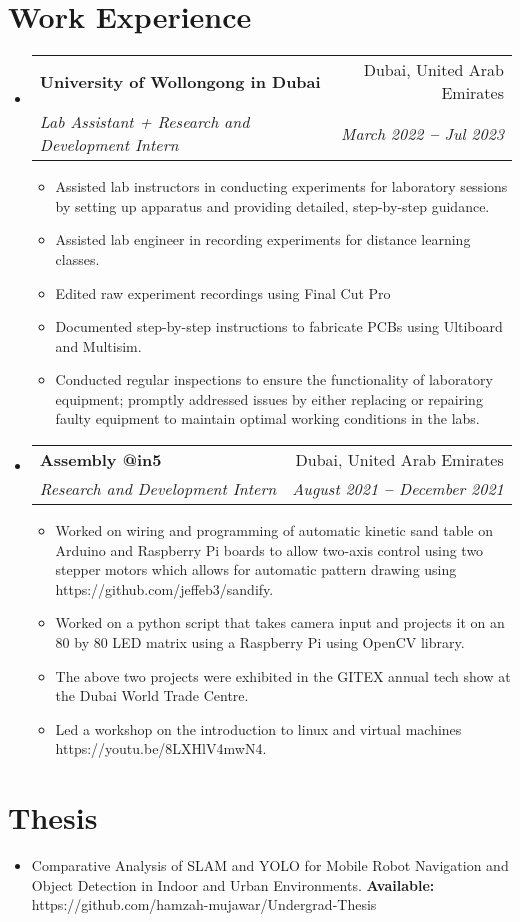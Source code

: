 \documentclass[letterpaper, 11pt]{article}
\makeatletter
\newcommand{\resumeItem}[1]{
  \item\small{
    {#1 \vspace{-2pt}}
  }
}
\newcommand{\resumeSubheading}[4]{
  \vspace{-2pt}\item
    \begin{tabular*}{0.97\textwidth}[t]{l@{\extracolsep{\fill}}r}
      \textbf{#1} & #2 \\
      \textit{\small#3} & \textit{\small #4} \\
    \end{tabular*}\vspace{-7pt}
}
\newcommand{\resumeSubHeadingListStart}{\begin{itemize}[leftmargin=0.15in, label={}]}
\newcommand{\resumeSubHeadingListEnd}{\end{itemize}}
\newcommand{\resumeItemListStart}{\begin{itemize}}
\newcommand{\resumeItemListEnd}{\end{itemize}\vspace{-5pt}}
\makeatother
\begin{document}
\section{Work Experience}
\vspace{3pt}
  \resumeSubHeadingListStart
    \resumeSubheading
      {University of Wollongong in Dubai}{Dubai, United Arab Emirates}
      {Lab Assistant + Research and Development Intern}{March 2022 \textbf{--} Jul 2023}
      \resumeItemListStart
        \resumeItem{Assisted lab instructors in conducting experiments for laboratory sessions by setting up apparatus and providing detailed, step-by-step guidance.}
        \resumeItem{Assisted lab engineer in recording experiments for distance learning classes.}
        \resumeItem{Edited raw experiment recordings using Final Cut Pro}
        \resumeItem{Documented step-by-step instructions to fabricate PCBs using Ultiboard and Multisim.}
        \resumeItem{Conducted regular inspections to ensure the functionality of laboratory equipment; promptly addressed issues by either replacing or repairing faulty equipment to maintain optimal working conditions in the labs.}
      \resumeItemListEnd

    \resumeSubheading
      {Assembly @in5}{Dubai, United Arab Emirates}
      {Research and Development Intern}{August 2021 \textbf{--} December 2021}
      \resumeItemListStart
        \resumeItem{Worked on wiring and programming of automatic kinetic sand table on Arduino and Raspberry Pi boards to allow two-axis control using two stepper motors which allows for automatic pattern drawing using https://github.com/jeffeb3/sandify.}
        \resumeItem{Worked on a python script that takes camera input and projects it on an 80 by 80 LED matrix using a Raspberry Pi using OpenCV library.}
        \resumeItem{The above two projects were exhibited in the GITEX annual tech show at the Dubai World Trade Centre.}
        \resumeItem{Led a workshop on the introduction to linux and virtual machines https://youtu.be/8LXHlV4mwN4.}
      \resumeItemListEnd
    \resumeSubHeadingListEnd

\section{Thesis}
\vspace{3pt}
  \resumeItemListStart
    \resumeItem{Comparative Analysis of SLAM and YOLO for Mobile Robot Navigation and Object Detection in Indoor and Urban Environments. \textbf{Available: }{https://github.com/hamzah-mujawar/Undergrad-Thesis}}
    \resumeItemListEnd
\end{document}
